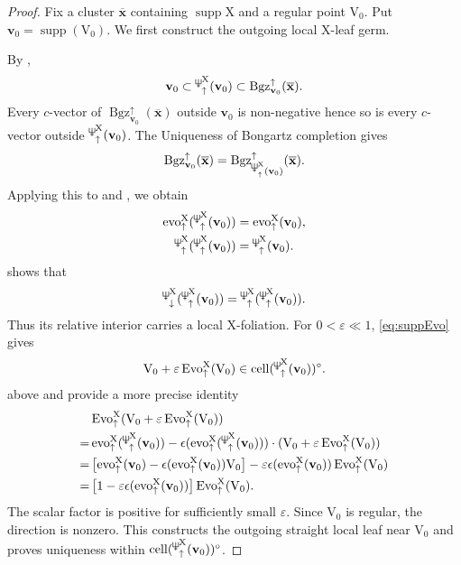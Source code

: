 \documentclass[11pt,reqno]{amsart}
\newcommand{\Neptune}{\mathord{\text{\tikz[baseline=-.5ex,scale=.13]{\draw[line width=.45pt] (0,0)--(0,1.8) (-.6,1.8)--(-.6,.8)--(.6,.8)--(.6,1.8) (-.35,.35)--(.35,.35);}}}}
\theoremstyle{plain}
\theoremstyle{definition}
\numberwithin{equation}{section}
\newcommand\<{\langle}
\renewcommand\>{\rangle}
\newcommand{\on}[1]{\operatorname{#1}}
\def\cc{\on{cell}}  %
\def\vv{\mathbf{v}}
\def\sink{X}
\newcommand{\flowu}[1]{\on{evo}^{#1}_{\uparrow}}
\newcommand{\flowU}[1]{\on{Evo}_{\uparrow}^{#1}}
\newcommand{\ccpt}[1]{\mathrm{#1}}%
\def\xevo{\ccpt{X}}%
\def\xx{\mathbf{x}}%
\def\supp{\on{supp}}
\newcommand{\Bgzp}[2]{\operatorname{Bgz}^{\uparrow}_{#2}(#1)}
\newcommand{\suppd}[1]{\operatorname{\Neptune}_{\downarrow}^{#1}}
\newcommand{\suppu}[1]{\operatorname{\Neptune}_{\uparrow}^{#1}}
\newcommand{\ol}[1]{\overline{#1}}
\def\csum{\epsilon}
\begin{document}
\begin{proof}
    Fix a cluster $\ol{\xx}$ containing $\supp\xevo$ and a regular point $\ccpt{V}_0$.
    Put $\vv_0=\supp(\ccpt{V}_0)$.
    We first construct the outgoing local $\xevo$-leaf germ.

    By ,
    \begin{gather}
        \vv_0\subset\suppu{\xevo}(\vv_0)\subset\Bgzp{\ol{\xx}}{\vv_0}.
    \end{gather}
    Every $c$-vector of $\Bgzp{\ol{\xx}}{\vv_0}$ outside $\vv_0$ is non-negative hence so is every $c$-vector outside $\suppu{\xevo}(\vv_0)$.
    The Uniqueness of Bongartz completion gives
    \begin{gather}
        \Bgzp{\ol{\xx}}{\vv_0}=\Bgzp{\ol{\xx}}{\suppu{\xevo}(\vv_0)}.
    \end{gather}
    Applying this to  and , we obtain
    \begin{gather}\label{eq:evo1}
        \flowu{\xevo}(\suppu{\xevo}(\vv_0))=\flowu{\xevo}(\vv_0),\\
        \suppu{\xevo}(\suppu{\xevo}(\vv_0))=\suppu{\xevo}(\vv_0).
    \end{gather}
     shows that 
    \begin{gather}
        \suppd{\xevo}(\suppu{\xevo}(\vv_0))=\suppu{\xevo}(\suppu{\xevo}(\vv_0)).
    \end{gather}
    Thus its relative interior carries a local $\xevo$-foliation. 
    For $0<\varepsilon\ll1$, \eqref{eq:suppEvo} gives
    \begin{gather}
        \ccpt{V}_0+\varepsilon\flowU{\xevo}(\ccpt{V}_0)\in\cc(\suppu{\xevo}(\vv_0))^\circ.
    \end{gather}
     above and  provide a more precise identity
    \begin{align*}
        &\flowU{\xevo}(\ccpt{V}_0+\varepsilon\flowU{\xevo}(\ccpt{V}_0))\\
        =&\flowu{\xevo}(    \suppu{\xevo}(\vv_0)    )   -  
        \csum(  
        \flowu{\xevo}(\suppu{\xevo}(\vv_0))
        )\cdot(    \ccpt{V}_0+\varepsilon\flowU{\xevo}(\ccpt{V}_0) 
        )\\
        =&\left[    \flowu{\xevo}(\vv_0)    -   \csum(\flowu{\xevo}(\vv_0))\ccpt{V}_0    \right]    -   \varepsilon\csum(\flowu{\xevo}(\vv_0))  \flowU{\xevo}(\ccpt{V}_0)\\
        =&\left[
        1-\varepsilon\csum(\flowu{\xevo}(\vv_0)) 
        \right]
        \flowU{\xevo}(\ccpt{V}_0).
    \end{align*}
    The scalar factor is positive for sufficiently small $\varepsilon$.
    Since $\ccpt{V}_0$ is regular, the direction is nonzero.
    This constructs the outgoing straight local leaf near $\ccpt{V}_0$ and proves uniqueness within $\cc(\suppu{\xevo}(\vv_0))^\circ$.


\end{proof}
\end{document}
